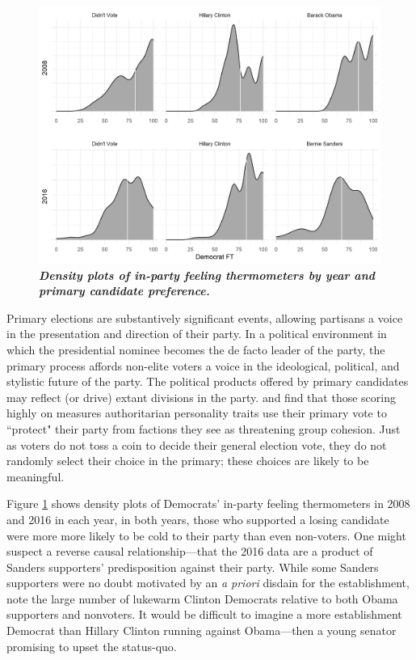\documentclass[12pt]{paper}
\begin{document}
\begin{figure}
\centering
\includegraphics[width=.7\textwidth]{primary-dem.png}
\caption{\label{fig:primary-dem} \textit{\textbf{Density plots of in-party feeling thermometers by year and primary candidate preference.}}}
\end{figure}
 Primary elections are substantively significant events, allowing partisans a voice in the presentation and direction of their party. In a political environment in which the presidential nominee becomes the de facto leader of the party, the primary process affords non-elite voters a voice in the ideological, political, and stylistic future of the party. The political products offered by primary candidates may reflect (or drive) extant divisions in the party. \cite{wronski2018tale} and \cite{bankert2020authoritarian} find that those scoring highly on measures authoritarian personality traits use their primary vote to ``protect" their party from factions they see as threatening group cohesion. Just as voters do not toss a coin to decide their general election vote, they do not randomly select their choice in the primary; these choices are likely to be meaningful. 

Figure \ref{fig:primary-dem} shows density plots of Democrats' in-party feeling thermometers in 2008 and 2016 in each year, in both years, those who supported a losing candidate were more more likely to be cold to their party than even non-voters. One might suspect a reverse causal relationship---that the 2016 data are a product of Sanders supporters' predisposition against their party. While some Sanders supporters were no doubt motivated by an \textit{a priori} disdain for the establishment, note the large number of lukewarm Clinton Democrats relative to both Obama supporters and nonvoters. It would be difficult to imagine a more establishment Democrat than Hillary Clinton running against Obama---then a young senator promising to upset the status-quo.
\end{document}
